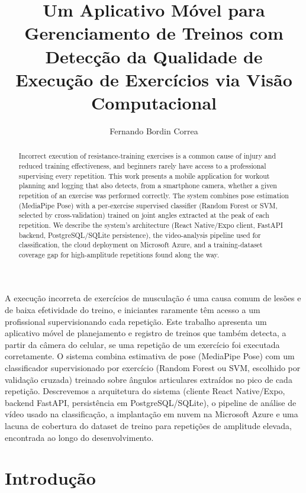 \documentclass[12pt]{article}
\title{Um Aplicativo Móvel para Gerenciamento de Treinos com Detecção da Qualidade de Execução de Exercícios via Visão Computacional}
\author{Fernando Bordin Correa\inst{1}}
\begin{document}
\maketitle

\begin{abstract}
  Incorrect execution of resistance-training exercises is a common cause of
  injury and reduced training effectiveness, and beginners rarely have
  access to a professional supervising every repetition. This work presents
  a mobile application for workout planning and logging that also detects,
  from a smartphone camera, whether a given repetition of an exercise was
  performed correctly. The system combines pose estimation (MediaPipe Pose)
  with a per-exercise supervised classifier (Random Forest or SVM,
  selected by cross-validation) trained on joint angles extracted at the
  peak of each repetition. We describe the system's architecture (React
  Native/Expo client, FastAPI backend, PostgreSQL/SQLite persistence),
  the video-analysis pipeline used for classification, the cloud deployment
  on Microsoft Azure, and a training-dataset coverage gap for high-amplitude
  repetitions found along the way.
\end{abstract}

\begin{resumo}
  A execução incorreta de exercícios de musculação é uma causa comum de
  lesões e de baixa efetividade do treino, e iniciantes raramente têm
  acesso a um profissional supervisionando cada repetição. Este trabalho
  apresenta um aplicativo móvel de planejamento e registro de treinos que
  também detecta, a partir da câmera do celular, se uma repetição de um
  exercício foi executada corretamente. O sistema combina estimativa de
  pose (MediaPipe Pose) com um classificador supervisionado por exercício
  (Random Forest ou SVM, escolhido por validação cruzada) treinado sobre
  ângulos articulares extraídos no pico de cada repetição. Descrevemos a
  arquitetura do sistema (cliente React Native/Expo, backend FastAPI,
  persistência em PostgreSQL/SQLite), o pipeline de análise de vídeo usado
  na classificação, a implantação em nuvem na Microsoft Azure e uma lacuna
  de cobertura do dataset de treino para repetições de amplitude elevada,
  encontrada ao longo do desenvolvimento.
\end{resumo}

\section{Introdução}
\end{document}
